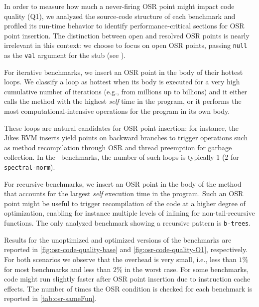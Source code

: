 In order to measure how much a never-firing OSR point might impact code quality (Q1), we analyzed the source-code structure of each benchmark and profiled its run-time behavior to identify performance-critical sections for OSR point insertion. The distinction between open and resolved OSR points is nearly irrelevant in this context: we choose to focus on open OSR points, passing {\tt null} as the {\tt val} argument for the stub (see \missing).

For iterative benchmarks, we insert an OSR point in the body of their hottest loops. We classify a loop as hottest when its body is executed for a very high cumulative number of iterations (e.g., from millions up to billions) and it either calls the method with the highest {\em self} time in the program, or it performs the most computational-intensive operations for the program in its own body.

These loops are natural candidates for OSR point insertion: for instance, the Jikes RVM inserts yield points on backward branches to trigger operations such as method recompilation through OSR and thread preemption for garbage collection. In the \shootout\ benchmarks, the number of such loops is typically 1 (2 for {\tt spectral-norm}).

For recursive benchmarks, we insert an OSR point in the body of the method that accounts for the largest {\em self} execution time in the program. Such an OSR point might be useful to trigger recompilation of the code at a higher degree of optimization, enabling for instance multiple levels of inlining for non-tail-recursive functions. The only analyzed benchmark showing a recursive pattern is {\tt b-trees}.

Results for the unoptimized and optimized versions of the benchmarks are reported in \myfigure\ref{fig:osr-code-quality-base} and \myfigure\ref{fig:osr-code-quality-O1}, respectively. For both scenarios we observe that the overhead is very small, i.e., less than $1\%$ for most benchmarks and less than $2\%$ in the worst case. For some benchmarks, code might run slightly faster after OSR point insertion due to instruction cache effects.
The number of times the OSR condition is checked for each benchmark is 
reported in \mytable\ref{tab:osr-sameFun}.

